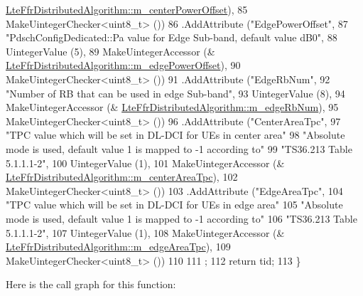 \begin{DoxyCode}
      \hyperlink{classns3_1_1LteFfrDistributedAlgorithm_ad531eeefae2433728d90e170b3d58efc}{LteFfrDistributedAlgorithm::m\_centerPowerOffset}),
85                    MakeUintegerChecker<uint8\_t> ())
86     .AddAttribute (\textcolor{stringliteral}{"EdgePowerOffset"},
87                    \textcolor{stringliteral}{"PdschConfigDedicated::Pa value for Edge Sub-band, default value dB0"},
88                    UintegerValue (5),
89                    MakeUintegerAccessor (&
      \hyperlink{classns3_1_1LteFfrDistributedAlgorithm_a6b076816f4079872f6579792a790b531}{LteFfrDistributedAlgorithm::m\_edgePowerOffset}),
90                    MakeUintegerChecker<uint8\_t> ())
91     .AddAttribute (\textcolor{stringliteral}{"EdgeRbNum"},
92                    \textcolor{stringliteral}{"Number of RB that can be used in edge Sub-band"},
93                    UintegerValue (8),
94                    MakeUintegerAccessor (&
      \hyperlink{classns3_1_1LteFfrDistributedAlgorithm_a93d1edadbdbf673c780413e7232fec02}{LteFfrDistributedAlgorithm::m\_edgeRbNum}),
95                    MakeUintegerChecker<uint8\_t> ())
96     .AddAttribute (\textcolor{stringliteral}{"CenterAreaTpc"},
97                    \textcolor{stringliteral}{"TPC value which will be set in DL-DCI for UEs in center area"}
98                    \textcolor{stringliteral}{"Absolute mode is used, default value 1 is mapped to -1 according to"}
99                    \textcolor{stringliteral}{"TS36.213 Table 5.1.1.1-2"},
100                    UintegerValue (1),
101                    MakeUintegerAccessor (&
      \hyperlink{classns3_1_1LteFfrDistributedAlgorithm_a7bcda9d730ee5d3b9c890e099b62105c}{LteFfrDistributedAlgorithm::m\_centerAreaTpc}),
102                    MakeUintegerChecker<uint8\_t> ())
103     .AddAttribute (\textcolor{stringliteral}{"EdgeAreaTpc"},
104                    \textcolor{stringliteral}{"TPC value which will be set in DL-DCI for UEs in edge area"}
105                    \textcolor{stringliteral}{"Absolute mode is used, default value 1 is mapped to -1 according to"}
106                    \textcolor{stringliteral}{"TS36.213 Table 5.1.1.1-2"},
107                    UintegerValue (1),
108                    MakeUintegerAccessor (&
      \hyperlink{classns3_1_1LteFfrDistributedAlgorithm_a60316c96f055b50b4a1295f373df6c1d}{LteFfrDistributedAlgorithm::m\_edgeAreaTpc}),
109                    MakeUintegerChecker<uint8\_t> ())
110 
111   ;
112   \textcolor{keywordflow}{return} tid;
113 \}
\end{DoxyCode}


Here is the call graph for this function\+:


